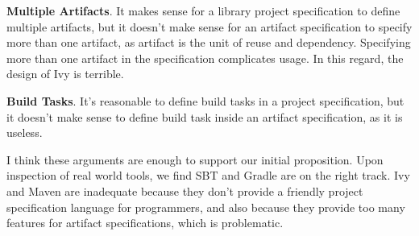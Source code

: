 \textbf{Multiple Artifacts}. It makes sense for a library project specification to define multiple artifacts, but it doesn't make sense for an artifact specification to specify more than one artifact, as artifact is the unit of reuse and dependency. Specifying more than one artifact in the specification complicates usage. In this regard, the design of Ivy is terrible.

\textbf{Build Tasks}. It's reasonable to define build tasks in a project specification, but it doesn't make sense to define build task inside an artifact specification, as it is useless.

I think these arguments are enough to support our initial proposition. Upon inspection of real world tools, we find SBT and Gradle are on the right track. Ivy and Maven are inadequate because they don't provide a friendly project specification language for programmers, and also because they provide too many features for artifact specifications, which is problematic.
